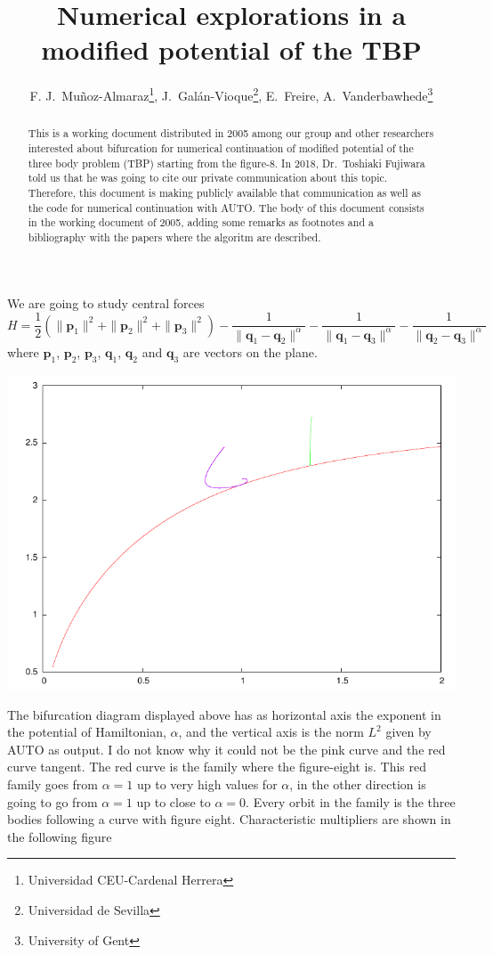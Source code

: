 \documentclass{article}
\title{Numerical explorations in a modified potential of the TBP}
\author{F. J.~Mu\~noz-Almaraz\footnote{Universidad CEU-Cardenal
    Herrera}, J.~Gal\'an-Vioque\footnote{Universidad de Sevilla},
  E.~Freire\footnotemark[2]%
  ,
  A.~Vanderbawhede\footnote{University of Gent}}
\begin{document}
\maketitle
\begin{abstract}
  This is a working document distributed in 2005 among our group and other
  researchers interested about bifurcation for numerical continuation
  of modified potential of the three body problem (TBP) starting from
  the figure-8\cite{Ocho}. In 2018, Dr.~Toshiaki Fujiwara told us that he was
  going to cite our private communication about this topic. Therefore,
 this document is making publicly available that communication as well
 as the code for numerical continuation  with AUTO. The body of this
 document consists in the working document of 2005, adding some
 remarks as footnotes and a bibliography with the papers where the
 algoritm are described. 
\end{abstract}
We are going to study central forces 
\begin{equation}
H=\frac 1 2 (\| \mathbf{p}_1\|^2 +\| \mathbf{p}_2\|^2+ \| \mathbf{p}_3\|^2) - \frac 1 {\|  \mathbf{q}_1-\mathbf{q}_2\|^{\alpha}}
-\frac 1 {\|  \mathbf{q}_1-\mathbf{q}_3\|^{\alpha}}-\frac 1 {\|  \mathbf{q}_2-\mathbf{q}_3\|^{\alpha}}
\end{equation}
where $\mathbf{p}_1$, $\mathbf{p}_2$, $\mathbf{p}_3$, $\mathbf{q}_1$, $\mathbf{q}_2$ and  $\mathbf{q}_3$ 
are vectors on the plane.
  
\includegraphics{bd.pdf}

The bifurcation diagram displayed above has as horizontal axis the exponent in the potential of Hamiltonian, $\alpha$, 
and the vertical axis is the norm $L^2$ given by AUTO as output. I do not know why it could not be the pink curve and  the red curve tangent.
The red curve is the family where the figure-eight is. This red family goes from $\alpha=1$ up to very high values for $\alpha$, in the other 
direction is going to go from $\alpha=1$ up to close to $\alpha=0$. Every orbit in the family is the three bodies following a curve with figure eight. 
Characteristic multipliers are shown in the following figure
\end{document}
